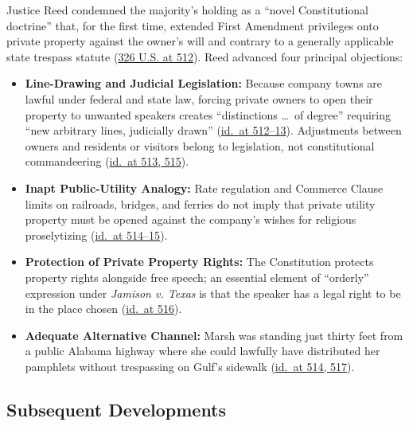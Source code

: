 \documentclass[12pt]{article}
\begin{document}
Justice Reed condemned the majority's holding as a ``novel Constitutional doctrine'' that, for the first time, extended First Amendment privileges onto private property against the owner's will and contrary to a generally applicable state trespass statute (\href{https://supreme.justia.com/cases/federal/us/326/501/}{326 U.S. at 512}). Reed advanced four principal objections:
\begin{itemize}
  \item \textbf{Line-Drawing and Judicial Legislation:} Because company towns are lawful under federal and state law, forcing private owners to open their property to unwanted speakers creates ``distinctions \dots\ of degree'' requiring ``new arbitrary lines, judicially drawn'' (\href{https://supreme.justia.com/cases/federal/us/326/501/}{id.\ at 512--13}). Adjustments between owners and residents or visitors belong to legislation, not constitutional commandeering (\href{https://supreme.justia.com/cases/federal/us/326/501/}{id.\ at 513, 515}).
  \item \textbf{Inapt Public-Utility Analogy:} Rate regulation and Commerce Clause limits on railroads, bridges, and ferries do not imply that private utility property must be opened against the company's wishes for religious proselytizing (\href{https://supreme.justia.com/cases/federal/us/326/501/}{id.\ at 514--15}).
  \item \textbf{Protection of Private Property Rights:} The Constitution protects property rights alongside free speech; an essential element of ``orderly'' expression under \textit{Jamison v. Texas} is that the speaker has a legal right to be in the place chosen (\href{https://supreme.justia.com/cases/federal/us/326/501/}{id.\ at 516}).
  \item \textbf{Adequate Alternative Channel:} Marsh was standing just thirty feet from a public Alabama highway where she could lawfully have distributed her pamphlets without trespassing on Gulf's sidewalk (\href{https://supreme.justia.com/cases/federal/us/326/501/}{id.\ at 514, 517}).
\end{itemize}

\subsection{Subsequent Developments}
\end{document}
